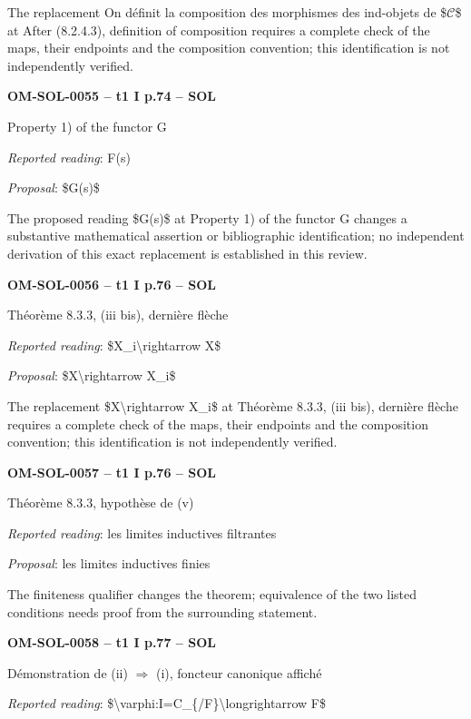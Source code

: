 The replacement On définit la composition des morphismes des ind-objets de \$\ensuremath{𝒞}\$ at After (8.2.4.3), definition of composition requires a complete check of the maps, their endpoints and the composition convention; this identification is not independently verified.\par
\par\noindent\textbf{OM-SOL-0055 -- t1 I p.74 -- SOL}\par
Property 1) of the functor G\par
\emph{Reported reading}: F(s)\par
\emph{Proposal}: \$G(s)\$\par
The proposed reading \$G(s)\$ at Property 1) of the functor G changes a substantive mathematical assertion or bibliographic identification; no independent derivation of this exact replacement is established in this review.\par
\par\noindent\textbf{OM-SOL-0056 -- t1 I p.76 -- SOL}\par
Théorème 8.3.3, (iii bis), dernière flèche\par
\emph{Reported reading}: \$X\_i\textbackslash{}rightarrow X\$\par
\emph{Proposal}: \$X\textbackslash{}rightarrow X\_i\$\par
The replacement \$X\textbackslash{}rightarrow X\_i\$ at Théorème 8.3.3, (iii bis), dernière flèche requires a complete check of the maps, their endpoints and the composition convention; this identification is not independently verified.\par
\par\noindent\textbf{OM-SOL-0057 -- t1 I p.76 -- SOL}\par
Théorème 8.3.3, hypothèse de (v)\par
\emph{Reported reading}: les limites inductives filtrantes\par
\emph{Proposal}: les limites inductives finies\par
The finiteness qualifier changes the theorem; equivalence of the two listed conditions needs proof from the surrounding statement.\par
\par\noindent\textbf{OM-SOL-0058 -- t1 I p.77 -- SOL}\par
Démonstration de (ii) \ensuremath{\Rightarrow} (i), foncteur canonique affiché\par
\emph{Reported reading}: \$\textbackslash{}varphi:I=\allowbreak C\_\{/F\}\textbackslash{}longrightarrow F\$\par
